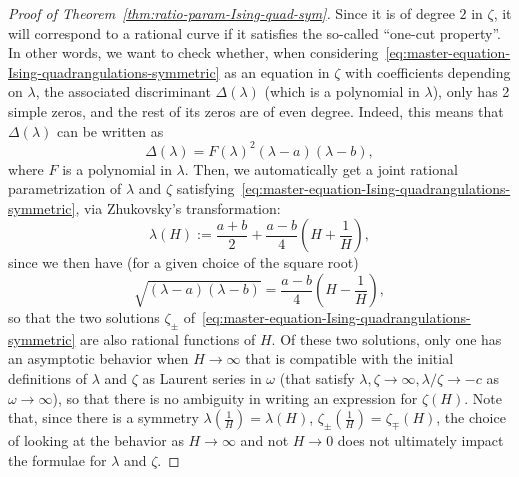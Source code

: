 \documentclass{scrartcl}
\begin{document}
\begin{proof}[Proof of Theorem~\ref{thm:ratio-param-Ising-quad-sym}]
Since it is of degree $2$ in $\zeta$, it will correspond to a rational curve if it satisfies the so-called ``one-cut property''. In other words, we want to check whether, when considering~\eqref{eq:master-equation-Ising-quadrangulations-symmetric} as an equation in $\zeta$ with coefficients depending on $\lambda$, the associated discriminant $\Delta(\lambda)$ (which is a polynomial in $\lambda$), only has 2 simple zeros, and the rest of its zeros are of even degree. Indeed, this means that $\Delta(\lambda)$ can be written as
\[
\Delta(\lambda)=F(\lambda)^2(\lambda-a)(\lambda-b),
\]
where $F$ is a polynomial in $\lambda$. Then, we automatically get a joint rational parametrization of $\lambda$ and $\zeta$ satisfying~\eqref{eq:master-equation-Ising-quadrangulations-symmetric}, via Zhukovsky's transformation:
\[
\lambda(H):=\frac{a+b}{2}+\frac{a-b}{4}\left(H+\frac{1}{H}\right),
\]
since we then have (for a given choice of the square root)
\[
\sqrt{(\lambda-a)(\lambda-b)}=\frac{a-b}{4}\left(H-\frac{1}{H}\right),
\]
so that the two solutions $\zeta_{\pm}$ of~\eqref{eq:master-equation-Ising-quadrangulations-symmetric} are also rational functions of $H$. Of these two solutions, only one has an asymptotic behavior when $H\to\infty$ that is compatible with the initial definitions of $\lambda$ and $\zeta$ as Laurent series in $\omega$ (that satisfy $\lambda,\zeta \to \infty, \lambda/\zeta\to -c$ as $\omega \to \infty$), so that there is no ambiguity in writing an expression for $\zeta(H)$. Note that, since there is a symmetry $\lambda(\frac{1}{H})=\lambda(H)$, $\zeta_{\pm}(\frac{1}{H})=\zeta_{\mp}(H)$, the choice of looking at the behavior as $H\to\infty$ and not $H\to 0$ does not ultimately impact the formulae for $\lambda$ and $\zeta$. 


\end{proof}
\end{document}
